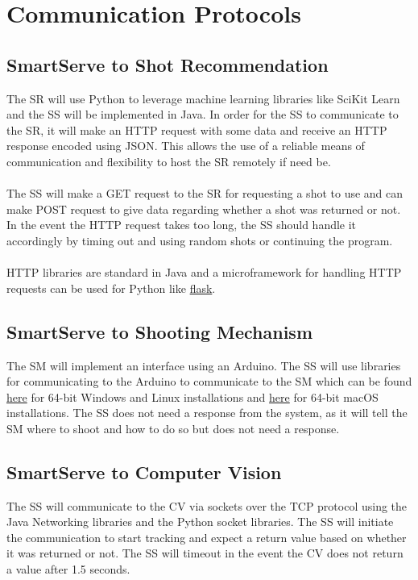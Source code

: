 \documentclass[11pt]{article}
\begin{document}
\section{Communication Protocols} %
\subsection{SmartServe to Shot Recommendation}
The SR will use Python to leverage machine learning libraries like SciKit Learn and the SS will be implemented in Java. In order for the SS to communicate to the SR, it will make an HTTP request with some data and receive an HTTP response encoded using JSON. This allows the use of a reliable means of communication and flexibility to host the SR remotely if need be. \\ \\
The SS will make a GET request to the SR for requesting a shot to use and can make POST request to give data regarding whether a shot was returned or not. In the event the HTTP request takes too long, the SS should handle it accordingly by timing out and using random shots or continuing the program. \\ \\
HTTP libraries are standard in Java and a microframework for handling HTTP requests can be used for Python like \href{http://flask.pocoo.org}{flask}.
\subsection{SmartServe to Shooting Mechanism}
The SM will implement an interface using an Arduino. The SS will use libraries for communicating to the Arduino to communicate to the SM which can be found \href{http://fizzed.com/oss/rxtx-for-java}{here} for 64-bit Windows and Linux installations and \href{http://blog.iharder.net/2009/08/18/rxtx-java-6-and-librxtxserial-jnilib-on-intel-mac-os-x/}{here} for 64-bit macOS installations. The SS does not need a response from the system, as it will tell the SM where to shoot and how to do so but does not need a response.
\subsection{SmartServe to Computer Vision}
The SS will communicate to the CV via sockets over the TCP protocol using the Java Networking libraries and the Python socket libraries. The SS will initiate the communication to start tracking and expect a return value based on whether it was returned or not. The SS will timeout in the event the CV does not return a value after 1.5 seconds.
\end{document}
